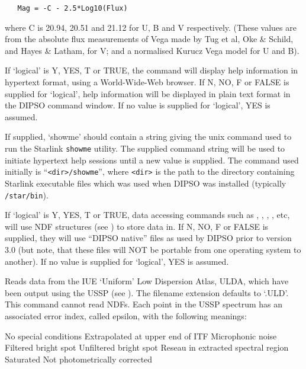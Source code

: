 \begin {description}
\begin{verbatim}
   Mag = -C - 2.5*Log10(Flux)
\end{verbatim}

where C is 20.94, 20.51 and 21.12 for U, B and V respectively. (These
values are from the absolute flux measurements of Vega made by Tug et
al, Oke \& Schild, and Hayes \& Latham, for V; and a normalised Kurucz
Vega model for U and B).

If `logical' is Y, YES, T or TRUE, the  
command will display help information in hypertext format, using a
World-Wide-Web browser. 
If N, NO, F or FALSE is supplied for `logical', help information will be
displayed in plain text format in the DIPSO command window. If no value 
is supplied for `logical', YES is assumed.

If supplied, `showme' should contain a string giving the unix command
used to run the Starlink {\tt showme} utility. The supplied command
string will be used to initiate hypertext help sessions until a new value
is supplied. The command used initially is ``\verb+<dir>/showme+'', where 
\verb+<dir>+ is the path to the directory containing Starlink executable
files which was used when DIPSO was installed (typically {\tt /star/bin}).

If `logical' is Y, YES, T or TRUE, data accessing commands such as 
, ,  
,  ,  etc,
will use NDF structures (see ) to store data in. If
N, NO, F or FALSE is supplied, they will use ``DIPSO native'' files as
used by DIPSO prior to version 3.0 (but note, that these files will NOT
be portable from one operating system to another). If no value is
supplied for `logical', YES is assumed.

Reads data from the IUE `Uniform' Low Dispersion Atlas, ULDA, which have been
output using the USSP (see ). The filename extension defaults to `.ULD'.
This command cannot read NDFs. Each point in the USSP spectrum has an associated
error index, called epsilon, with the following meanings:

\begin{dipdesc}
 {No special conditions}
 {Extrapolated at upper end of ITF}
 {Microphonic noise}
 {Filtered bright spot}
 {Unfiltered bright spot}
 {Reseau in extracted spectral region}
 {Saturated}
 {Not photometrically corrected}
\end{dipdesc}


\end{description}
